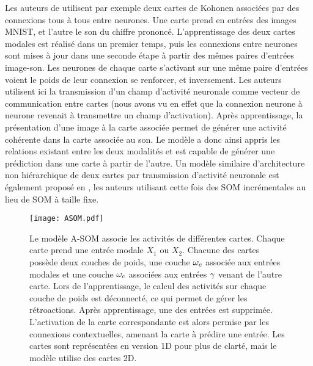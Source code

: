 \documentclass[../main]{subfiles}
\begin{document}
Les auteurs de \cite{khacef_brain-inspired_2020} utilisent par exemple deux cartes de Kohonen associées par des connexions tous à tous entre neurones. Une carte prend en entrées des images MNIST, et l'autre le son du chiffre prononcé. L'apprentissage des deux cartes modales est réalisé dans un premier temps, puis les connexions entre neurones sont mises à jour dans une seconde étape à partir des mêmes paires d'entrées image-son. Les neurones de chaque carte s'activant sur une même paire d'entrées voient le poids de leur connexion se renforcer, et inversement. Les auteurs utilisent ici la transmission d'un champ d'activité neuronale comme vecteur de communication entre cartes (nous avons vu en effet que la connexion neurone à neurone revenait à transmettre un champ d'activation).
Après apprentissage, la présentation d'une image à la carte associée permet de générer une activité cohérente dans la carte associée au son. Le modèle a donc ainsi appris les relations existant entre les deux modalités et est capable de générer une prédiction dans une carte à partir de l'autre.
Un modèle similaire d'architecture non hiérarchique de deux cartes par transmission d'activité neuronale est également proposé en \cite{jayaratne_bio-inspired_2018}, les auteurs utilisant cette fois des SOM incrémentales au lieu de SOM à taille fixe.

\begin{figure}
    \centering\texttt{[image: ASOM.pdf]}
    \caption{Le modèle A-SOM \parencite{johnsson_associative_2009} associe les activités de différentes cartes. Chaque carte prend une entrée modale $X_1$ ou $X_2$. Chacune des cartes possède deux couches de poids, une couche $\omega_e$ associée aux entrées modales et une couche $\omega_c$ associées aux entrées $\gamma$ venant de l'autre carte. Lors de l'apprentissage, le calcul des activités sur chaque couche de poids est déconnecté, ce qui permet de gérer les rétroactions. 
    Après apprentissage, une des entrées est supprimée. L'activation de la carte correspondante est alors permise par les connexions contextuelles, amenant la carte à prédire une entrée. Les cartes sont représentées en version 1D pour plus de clarté, mais le modèle utilise des cartes 2D.
    \label{fig:asom}}
\end{figure}
\end{document}
